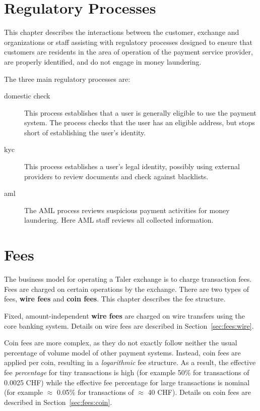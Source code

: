 \documentclass[10pt,a4paper,oneside]{book}
\begin{document}
\chapter{Regulatory Processes} \label{chap:regproc}

This chapter describes the interactions between the customer, exchange and
organizations or staff assisting with regulatory processes designed to ensure
that customers are residents in the area of operation of the payment service
provider, are properly identified, and do not engage in money laundering.

The three main regulatory processes are:

\begin{description}
\item[domestic check] This process establishes that a user is generally
  eligible to use the payment system.  The process checks that the user has an
  eligible address, but stops short of establishing the user's identity.
\item[kyc] This process establishes a user's legal identity, possibly
  using external providers to review documents and check against blacklists.
\item[aml] The AML process reviews suspicious payment activities for
  money laundering. Here AML staff reviews all collected information.
\end{description}





\chapter{Fees} \label{chap:fees}

The business model for operating a Taler exchange is to charge transaction
fees.  Fees are charged on certain operations by the exchange.  There are two
types of fees, {\bf wire fees} and {\bf coin fees}.  This chapter describes
the fee structure.

Fixed, amount-independent {\bf wire fees} are charged on wire transfers using
the core banking system.  Details on wire fees are described in
Section~\ref{sec:fees:wire}.

Coin fees are more complex, as they do not exactly follow neither the usual
percentage of volume model of other payment systems.  Instead, coin fees are
applied per coin, resulting in a {\em logarithmic} fee structure.  As a
result, the effective fee {\em percentage} for tiny transactions is high (for
example 50\% for transactions of 0.0025 CHF) while the effective fee
percentage for large transactions is nominal (for example $\approx$ 0.05\% for
transactions of $\approx$ 40 CHF). Details on coin fees are described in
Section~\ref{sec:fees:coin}.
\end{document}

